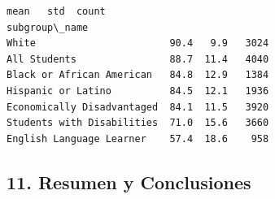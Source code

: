 \documentclass[11pt]{article}
\makeatletter
\newcommand{\boxspacing}{\kern\kvtcb@left@rule\kern\kvtcb@boxsep}
\newcommand{\prompt}[4]{
        {\ttfamily\llap{{\color{#2}[#3]:\hspace{3pt}#4}}\vspace{-\baselineskip}}
    }
\makeatother
\begin{document}
            \begin{tcolorbox}[breakable, size=fbox, boxrule=.5pt, pad at break*=1mm, opacityfill=0]
\prompt{Out}{outcolor}{16}{\boxspacing}
\begin{Verbatim}[commandchars=\\\{\}]
                            mean   std  count
subgroup\_name
White                       90.4   9.9   3024
All Students                88.7  11.4   4040
Black or African American   84.8  12.9   1384
Hispanic or Latino          84.5  12.1   1936
Economically Disadvantaged  84.1  11.5   3920
Students with Disabilities  71.0  15.6   3660
English Language Learner    57.4  18.6    958
\end{Verbatim}
\end{tcolorbox}
        
    \subsection{11. Resumen y Conclusiones}\label{resumen-y-conclusiones}
\end{document}

